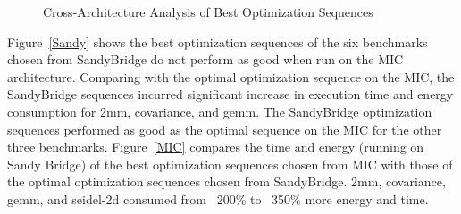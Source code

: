 \begin{figure}
\centering
{} 
\caption{Cross-Architecture Analysis of Best Optimization Sequences}                   
\label{fig:Brdr2d-TE}                                                   
\end{figure} 

Figure~\ref{Sandy} shows the best optimization sequences of the six benchmarks
chosen from SandyBridge do not perform as good when run on the MIC architecture. 
Comparing with the optimal optimization sequence on the MIC, the SandyBridge
sequences incurred significant increase in execution time and energy consumption
for 2mm, covariance, and gemm. The SandyBridge optimization sequences 
performed as good as the optimal sequence on the MIC for the other three benchmarks. 
Figure~\ref{MIC} compares the time and energy (running on Sandy Bridge) of 
the best optimization sequences chosen from MIC with those of the optimal optimization 
sequences chosen from SandyBridge. 2mm, covariance, gemm, and seidel-2d consumed
from ~200\% to ~350\% more energy and time. 
